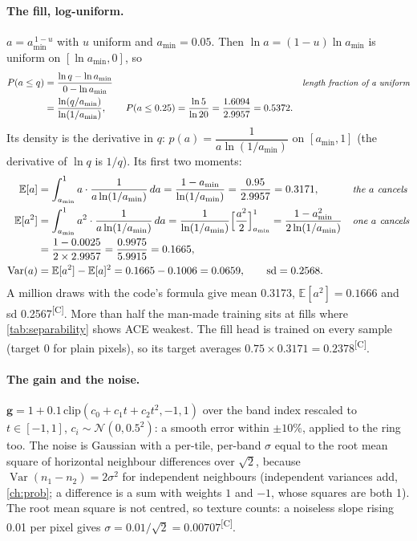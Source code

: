 \documentclass[11pt,a4paper,oneside,openany]{book}
\newcommand{\B}[1]{{\symbf{#1}}}
\newcommand{\B}[1]{{\bm{#1}}}
\newcommand{\comp}{\textsuperscript{\textsf{\scriptsize[C]}}}
\newcommand{\E}{\mathbb{E}}
\newcommand{\Var}{\operatorname{Var}}
\newcommand{\vg}{\B{g}}
\newcommand{\why}[1]{&&\text{\small\itshape #1}}
\begin{document}
\paragraph{The fill, log-uniform.} $a=a_{\min}^{\,1-u}$ with $u$ uniform and $a_{\min}=0.05$. Then $\ln a=(1-u)\ln a_{\min}$ is uniform on $[\ln a_{\min},0]$, so
\begin{align*}
P(a\le q) &= \frac{\ln q-\ln a_{\min}}{0-\ln a_{\min}} \why{length fraction of a uniform}\\
&= \frac{\ln(q/a_{\min})}{\ln(1/a_{\min})}, \qquad P(a\le0.25)=\frac{\ln5}{\ln20}=\frac{1.6094}{2.9957}=0.5372 .
\end{align*}
Its density is the derivative in $q$: $p(a)=\dfrac{1}{a\ln(1/a_{\min})}$ on $[a_{\min},1]$ (the derivative of $\ln q$ is $1/q$). Its first two moments:
\begin{align*}
\E[a] &= \int_{a_{\min}}^{1} a\cdot\frac{1}{a\ln(1/a_{\min})}\,da = \frac{1-a_{\min}}{\ln(1/a_{\min})} = \frac{0.95}{2.9957} = 0.3171, \why{the $a$ cancels}\\
\E[a^2] &= \int_{a_{\min}}^{1} a^2\cdot\frac{1}{a\ln(1/a_{\min})}\,da = \frac{1}{\ln(1/a_{\min})}\Big[\frac{a^2}{2}\Big]_{a_{\min}}^{1}
= \frac{1-a_{\min}^2}{2\ln(1/a_{\min})} \why{one $a$ cancels}\\
&= \frac{1-0.0025}{2\times2.9957} = \frac{0.9975}{5.9915} = 0.1665,\\
\Var(a) &= \E[a^2]-\E[a]^2 = 0.1665-0.1006 = 0.0659,\qquad \mathrm{sd}=0.2568 .
\end{align*}
A million draws with the code's formula give mean 0.3173, $\E[a^2]=0.1666$ and sd 0.2567\comp. More than half the man-made training sits at fills where
\cref{tab:separability} shows ACE weakest. The fill head is trained on every sample (target 0 for plain pixels), so its target averages $0.75\times0.3171=0.2378$\comp.

\paragraph{The gain and the noise.} $\vg=1+0.1\,\mathrm{clip}(c_0+c_1t+c_2t^2,-1,1)$ over the band index rescaled to $t\in[-1,1]$, $c_i\sim\mathcal N(0,0.5^2)$:
a smooth error within $\pm10\%$, applied to the ring too. The noise is Gaussian with a per-tile, per-band $\sigma$ equal to the root mean square of horizontal neighbour
differences over $\sqrt2$, because $\Var(n_1-n_2)=2\sigma^2$ for independent neighbours (independent variances add, \cref{ch:prob}; a difference is a sum with weights $1$ and $-1$, whose squares are both 1). The root mean square is not centred, so texture
counts: a noiseless slope rising 0.01 per pixel gives $\sigma=0.01/\sqrt2=0.00707$\comp.
\end{document}
